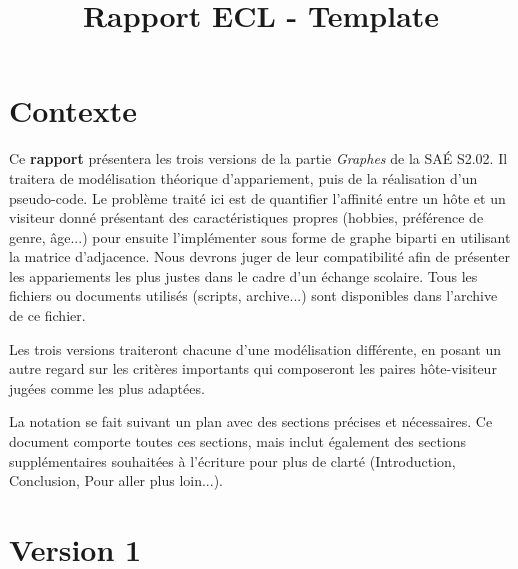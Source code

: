 \documentclass{mytex}
\title{Rapport ECL - Template} %
\begin{document}




        
\fairemarges %
\fairepagedegarde %
\tabledematieres %


\section{Contexte}

Ce \textbf{rapport} présentera les trois versions de la partie \emph{Graphes} de la SAÉ S2.02. Il traitera de modélisation théorique d'appariement, puis de la réalisation d'un pseudo-code. Le problème traité ici est de quantifier l'affinité entre un hôte et un visiteur donné présentant des caractéristiques propres (hobbies, préférence de genre, âge...) pour ensuite l'implémenter sous forme de graphe biparti en utilisant la matrice d'adjacence. Nous devrons juger de leur compatibilité afin de présenter les appariements les plus justes dans le cadre d'un échange scolaire. Tous les fichiers ou documents utilisés (scripts, archive...) sont disponibles dans l'archive de ce fichier.

Les trois versions traiteront chacune d'une modélisation différente, en posant un autre regard sur les critères importants qui composeront les paires hôte-visiteur jugées comme les plus adaptées.


La notation se fait suivant un plan avec des sections précises et nécessaires. Ce document comporte toutes ces sections, mais inclut également des sections supplémentaires souhaitées à l'écriture pour plus de clarté (Introduction, Conclusion, Pour aller plus loin...).

\section{Version 1} 
\end{document}
